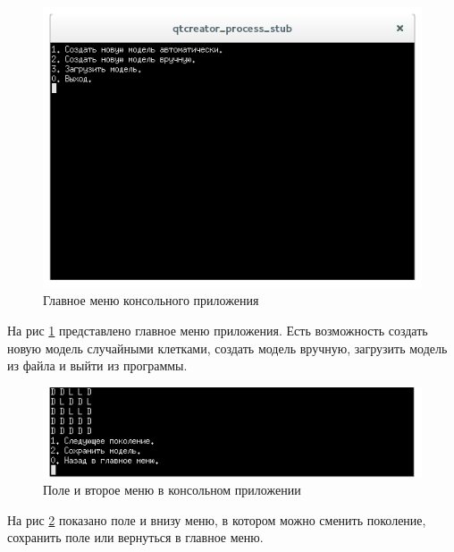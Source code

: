 \documentclass[a4paper]{article}
\begin{document}
\begin{figure}[H]
	\begin{center}
		\includegraphics[scale=0.5]{console}
		\caption{Главное меню консольного приложения} 
		\label{pic:console} %
	\end{center}
\end{figure}

На рис \ref{pic:console} представлено главное меню приложения. Есть возможность создать новую модель случайными клетками, создать модель вручную, загрузить модель из файла и выйти из программы. 

\begin{figure}[H]
	\begin{center}
		\includegraphics[scale=0.5]{console2}
		\caption{Поле и второе меню в консольном приложении} 
		\label{pic:secondMenu} %
	\end{center}
\end{figure}

На рис \ref{pic:secondMenu} показано поле и внизу меню, в котором можно сменить поколение, сохранить поле или вернуться в главное меню.
\end{document}
